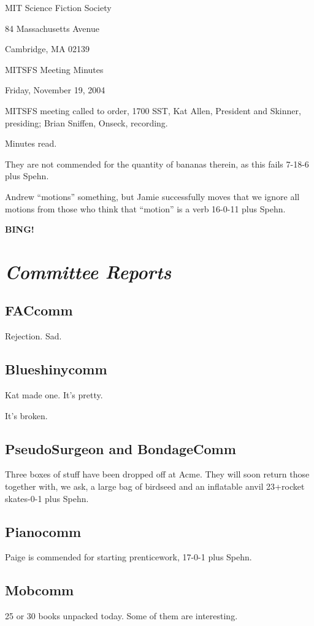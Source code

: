 \documentclass[10pt]{article}
\newcommand{\bing}{{\bf BING!} }
\newcommand{\goto}[1]{\bing \vskip 12pt \section*{{\em{#1}}}}
\newcommand{\ps}{ plus Spehn\xspace}
\begin{document}
\begin{center}

MIT Science Fiction Society

84 Massachusetts Avenue

Cambridge, MA 02139

\vspace{12pt}

MITSFS Meeting Minutes

Friday, November 19, 2004

\end{center}

\vspace{18pt}

\setlength{\parskip}{6pt}

\noindent
MITSFS meeting called to order, 1700 SST, Kat Allen, President and
Skinner, presiding; Brian Sniffen,  Onseck, recording.

Minutes read.

They are not commended for the quantity of bananas therein, as this fails 7-18-6\ps.

Andrew ``motions'' something, but Jamie successfully moves that we
ignore all motions from those who think that ``motion'' is a verb 16-0-11\ps.

\goto{Committee Reports}
\subsection*{FACcomm} Rejection.  Sad.
\subsection*{Blueshinycomm}
Kat made one.  It's pretty.

It's broken.

\subsection*{PseudoSurgeon and BondageComm}

Three boxes of stuff have been dropped off at Acme.  They will soon
return those together with, we ask, a large bag of birdseed and an
inflatable anvil 23+rocket skates-0-1\ps.

\subsection*{Pianocomm}
Paige is commended for starting prenticework, 17-0-1\ps.

\subsection*{Mobcomm}
25 or 30 books unpacked today.  Some of them are interesting.
\end{document}
